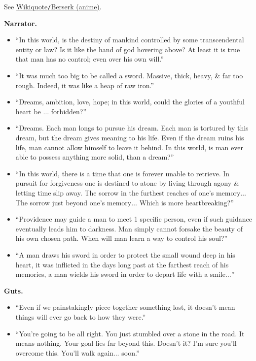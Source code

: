 \documentclass{article}
\begin{document}
\begin{enumerate}
    See \href{https://en.wikiquote.org/wiki/Berserk_(anime)}{Wikiquote{\tt/}Berserk (anime)}.

    {\bf Narrator.}
   	\begin{itemize}
   		\item ``In this world, is the destiny of mankind controlled by some transcendental entity or law? Is it like the hand of god hovering above? At least it is true that man has no control; even over his own will.''
   		\item ``It was much too big to be called a sword. Massive, thick, heavy, \& far too rough. Indeed, it was like a heap of raw iron.''
   		\item ``Dreams, ambition, love, hope; in this world, could the glories of a youthful heart be $\ldots$ forbidden?''
   		\item ``Dreams. Each man longs to pursue his dream. Each man is tortured by this dream, but the dream gives meaning to his life. Even if the dream ruins his life, man cannot allow himself to leave it behind. In this world, is man ever able to possess anything more solid, than a dream?''
   		\item ``In this world, there is a time that one is forever unable to retrieve. In pursuit for forgiveness one is destined to atone by living through agony \& letting time slip away. The sorrow in the furthest reaches of one's memory$\ldots$ The sorrow just beyond one's memory$\ldots$ Which is more heartbreaking?''
   		\item ``Providence may guide a man to meet 1 specific person, even if such guidance eventually leads him to darkness. Man simply cannot forsake the beauty of his own chosen path. When will man learn a way to control his soul?''
   		\item ``A man draws his sword in order to protect the small wound deep in his heart, it was inflicted in the days long past at the farthest reach of his memories, a man wields his sword in order to depart life with a smile$\ldots$''
   	\end{itemize}
    {\bf Guts.}
    \begin{itemize}
    	\item ``Even if we painstakingly piece together something lost, it doesn't mean things will ever go back to how they were.''
    	\item ``You're going to be all right. You just stumbled over a stone in the road. It means nothing. Your goal lies far beyond this. Doesn't it? I'm sure you'll overcome this. You'll walk again$\ldots$ soon.''

\end{itemize}
\end{enumerate}
\end{document}
